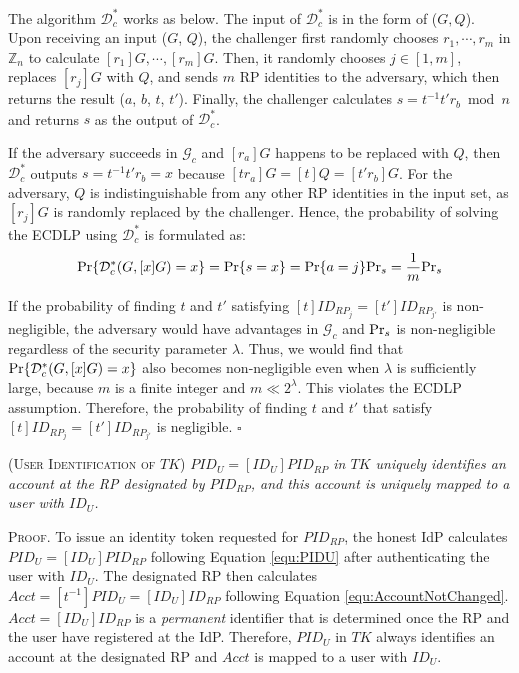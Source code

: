 The algorithm $\mathcal{D}^*_c$ works as below.
The input of $\mathcal{D}^*_c$ is in the form of ($G, Q$). Upon receiving an input ($G$, $Q$), the challenger first randomly chooses $r_1, \cdots, r_m$ in $\mathbb{Z}_n$ to calculate $[r_1]G, \cdots, [r_m]G$.
Then, it randomly chooses $j \in [1,m]$, replaces $[r_j]G$ with $Q$, and sends $m$ RP identities to the adversary, which then returns the result ($a$, $b$, $t$, $t'$). Finally, the challenger calculates $s = t^{-1}t'r_b \bmod n$ and returns $s$ as the output of $\mathcal{D}^*_c$.

If the adversary succeeds in $\mathcal{G}_c$ and $[r_a]G$ happens to be replaced with $Q$, then $\mathcal{D}^*_c$ outputs $s=t^{-1}t'r_b =x$ because $[tr_a]G = [t]Q = [t'r_b]G$. For the adversary, $Q$ is indistinguishable from any other RP identities in the input set, as $[r_j]G$ is randomly replaced by the challenger.
Hence, the probability of solving the ECDLP using $\mathcal{D}^*_c$ is formulated as:
\begin{equation*}
{\rm Pr}\{\mathcal{D}^*_c(G, [x]G)=x\} = {\rm Pr}\{s = x\}={\rm Pr}\{a=j\}{\rm Pr}_s=\frac{1}{m}{\rm Pr}_s
\end{equation*}

If the probability of finding $t$ and $t'$ satisfying $[t]ID_{RP_j} = [t']ID_{RP_{j'}}$ is non-negligible, the adversary would have advantages  in $\mathcal{G}_c$ and ${\rm Pr}_s$ is non-negligible regardless of the security parameter $\lambda$.
Thus, we would find that ${\rm Pr}\{\mathcal{D}^*_c(G, [x]G)=x\}$ also becomes non-negligible even when $\lambda$ is sufficiently large, because $m$ is a finite integer and $m \ll 2^\lambda$.
\oldc
This violates the ECDLP assumption. Therefore, the probability of finding $t$ and $t'$ that satisfy $[t]ID_{RP_j} = [t']ID_{RP_{j'}}$ is negligible. \hfill $\square$


\newc

\begin{thm}
\textsc{(User Identification of $TK$)} \emph{$PID_U= [ID_U]PID_{RP}$ in $TK$ uniquely identifies an account at the RP designated by $PID_{RP}$, and this account is uniquely mapped to a user with $ID_U$.}
\end{thm}

\noindent\textsc{Proof.}
To issue an identity token requested for $PID_{RP}$, the honest IdP calculates $PID_U = [ID_U]PID_{RP}$ following Equation \ref{equ:PIDU} after authenticating the user with $ID_U$. The designated RP then calculates $Acct = [t^{-1}]PID_{U} = [ID_U]ID_{RP}$ following Equation \ref{equ:AccountNotChanged}.
$Acct = [ID_U]ID_{RP}$ is a \emph{permanent} identifier that is determined once the RP and the user have registered at the IdP. Therefore, $PID_U$ in $TK$ always identifies an account at the designated RP and $Acct$ is mapped to a user with $ID_U$.

